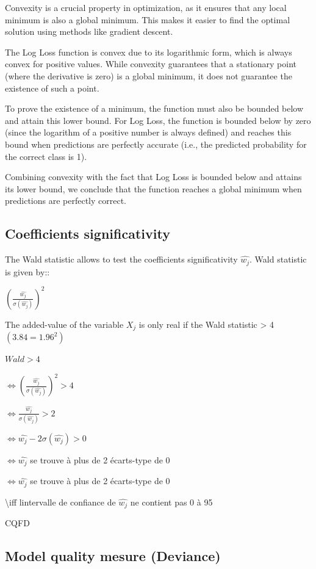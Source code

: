 \documentclass{article}
\begin{document}
Convexity is a crucial property in optimization, as it ensures that any
local minimum is also a global minimum. This makes it easier to find the
optimal solution using methods like gradient descent.

The Log Loss function is convex due to its logarithmic form, which is
always convex for positive values. While convexity guarantees that a
stationary point (where the derivative is zero) is a global minimum, it
does not guarantee the existence of such a point.

To prove the existence of a minimum, the function must also be bounded
below and attain this lower bound. For Log Loss, the function is bounded
below by zero (since the logarithm of a positive number is always
defined) and reaches this bound when predictions are perfectly accurate
(i.e., the predicted probability for the correct class is 1).

Combining convexity with the fact that Log Loss is bounded below and
attains its lower bound, we conclude that the function reaches a global
minimum when predictions are perfectly correct.

\subsection{Coefficients
significativity}\label{coefficients-significativity}

The Wald statistic allows to test the coefficients significativity
\(\hat{w_j}\). Wald statistic is given by::

\((\frac{\hat{w_j}}{\sigma(\hat{w_j})})^2\)

The added-value of the variable \(X_j\) is only real if the Wald
statistic \textgreater{} 4 \((3.84 = 1.96^2)\)

\(Wald > 4\)

\(\iff (\frac{\hat{w_j}}{\sigma(\hat{w_j})})^2 > 4\)

\(\iff \frac{\hat{w_j}}{\sigma(\hat{w_j})} > 2\)



\(\iff \hat{w_j} - 2\sigma(\hat{w_j}) > 0\)

\(\iff \hat{w_j}\) se trouve à plus de 2 écarts-type de 0


\(\iff \hat{w_j}\) se trouve à plus de 2 écarts-type de 0

\textbackslash iff  l\textquotesingle intervalle de confiance de
\(\hat{w_j}\) ne contient pas 0 à 95%

CQFD

\subsection{Model quality mesure
(Deviance)}\label{model-quality-mesure-deviance}
\end{document}
